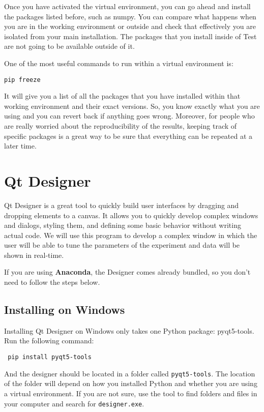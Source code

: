 Once you have activated the virtual environment, you can go ahead and install the packages listed before, such as numpy. You can compare what happens when you are in the working environment or outside and check that effectively you are isolated from your main installation. The packages that you install inside of Test are not going to be available outside of it.

One of the most useful commands to run within a virtual environment is:

\begin{verbatim}
pip freeze
\end{verbatim}

It will give you a list of all the packages that you have installed within that working environment and their exact versions. So, you know exactly what you are using and you can revert back if anything goes wrong. Moreover, for people who are really worried about the reproducibility of the results, keeping track of specific packages is a great way to be sure that everything can be repeated at a later time.

\section{Qt Designer}
Qt Designer is a great tool to quickly build user interfaces by dragging and dropping elements to a canvas. It allows you to quickly develop complex windows and dialogs, styling them, and defining some basic behavior without writing actual code. We will use this program to develop a complex window in which the user will be able to tune the parameters of the experiment and data will be shown in real-time. 

If you are using \textbf{Anaconda}, the Designer comes already bundled, so you don't need to follow the steps below.

\subsection{Installing on Windows}
Installing Qt Designer on Windows only takes one Python package: pyqt5-tools. Run the following command:

\begin{verbatim}
 pip install pyqt5-tools
\end{verbatim}

And the designer should be located in a folder called \texttt{pyqt5-tools}. The location of the folder will depend on how you installed Python and whether you are using a virtual environment. If you are not sure, use the tool to find folders and files in your computer and search for \texttt{designer.exe}.

